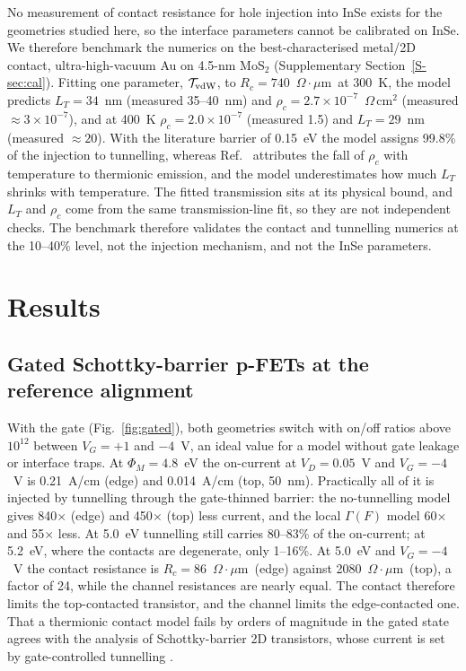 \documentclass[11pt]{article}
\providecommand{\ohmum}{\ensuremath{\Omega\cdot\mu\mathrm{m}}}
\providecommand{\ohmum}{\ensuremath{\Omega\cdot\mu\mathrm{m}}}
\begin{document}
No measurement of contact resistance for hole injection into InSe exists for the geometries studied here, so the interface parameters cannot be calibrated on InSe. We therefore benchmark the numerics on the best-characterised metal/2D contact, ultra-high-vacuum Au on 4.5-nm MoS$_2$ \cite{refenglish} (Supplementary Section~\ref{S-sec:cal}). Fitting one parameter, $\mathcal{T}_{\rm vdW}$, to $R_c=740$~\ohmum\ at 300~K, the model predicts $L_T=34$~nm (measured 35--40~nm) and $\rho_c=2.7\times10^{-7}$~$\Omega$\,cm$^2$ (measured $\approx3\times10^{-7}$), and at 400~K $\rho_c=2.0\times10^{-7}$ (measured 1.5) and $L_T=29$~nm (measured $\approx20$). With the literature barrier of 0.15~eV the model assigns 99.8\% of the injection to tunnelling, whereas Ref.~\cite{refenglish} attributes the fall of $\rho_c$ with temperature to thermionic emission, and the model underestimates how much $L_T$ shrinks with temperature. The fitted transmission sits at its physical bound, and $L_T$ and $\rho_c$ come from the same transmission-line fit, so they are not independent checks. The benchmark therefore validates the contact and tunnelling numerics at the 10--40\% level, not the injection mechanism, and not the InSe parameters.

\section{Results}
\subsection{Gated Schottky-barrier p-FETs at the reference alignment}
\label{sec:gated}
With the gate (Fig.~\ref{fig:gated}), both geometries switch with on/off ratios above $10^{12}$ between $V_G=+1$ and $-4$~V, an ideal value for a model without gate leakage or interface traps. At $\Phi_M=4.8$~eV the on-current at $V_D=0.05$~V and $V_G=-4$~V is 0.21~A/cm (edge) and 0.014~A/cm (top, 50~nm). Practically all of it is injected by tunnelling through the gate-thinned barrier: the no-tunnelling model gives 840$\times$ (edge) and 450$\times$ (top) less current, and the local $\Gamma(F)$ model 60$\times$ and 55$\times$ less. At 5.0~eV tunnelling still carries 80--83\% of the on-current; at 5.2~eV, where the contacts are degenerate, only 1--16\%. At 5.0~eV and $V_G=-4$~V the contact resistance is $R_c=86$~\ohmum\ (edge) against 2080~\ohmum\ (top), a factor of 24, while the channel resistances are nearly equal. The contact therefore limits the top-contacted transistor, and the channel limits the edge-contacted one. That a thermionic contact model fails by orders of magnitude in the gated state agrees with the analysis of Schottky-barrier 2D transistors, whose current is set by gate-controlled tunnelling \cite{refdas13,refpenu}.
\end{document}
